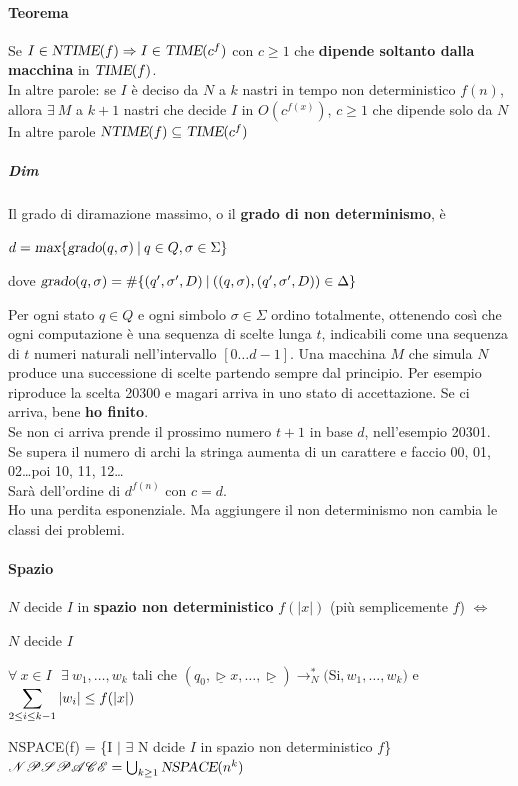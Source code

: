 \documentclass[10pt]{book}
\begin{document}
\paragraph{Teorema} Se $I \in \textsl{NTIME}(f) \Rightarrow I \in \textsl{TIME}(c^f)   $ con $c \geq 1$ che \textbf{dipende soltanto dalla macchina} in $\textsl{TIME}(f)$.\\ In altre parole: se $I$ è deciso da $N$ a $k$ nastri in tempo non deterministico $f(n)$, allora $\exists\:M$ a $k+1$ nastri che decide $I$ in $O(c^{f(x)})$, $c \geq 1$ che dipende solo da $N$\\
In altre parole $\textsl{NTIME}(f) \subseteq \textsl{TIME}(c^f)$
\pagebreak
\subparagraph{Dim} Il grado di diramazione massimo, o il \textbf{grado di non determinismo}, è 
\begin{list}{}{}
	\item $d = \textsl{max}\{\textsl{grado}(q, \sigma)\:|\:q\in Q, \sigma \in \Sigma\}$
	\item dove $\textsl{grado}(q, \sigma) = \#\{(q', \sigma', D)\:|\:((q, \sigma), (q', \sigma', D))\in \Delta \}$
\end{list}
Per ogni stato $q \in Q$ e ogni simbolo $\sigma \in \Sigma$ ordino totalmente, ottenendo così che ogni computazione è una sequenza di scelte lunga $t$, indicabili come una sequenza di $t$ numeri naturali nell'intervallo $[0\ldots d-1]$. Una macchina $M$ che simula $N$ produce una successione di scelte partendo sempre dal principio. Per esempio riproduce la scelta 20300 e magari arriva in uno stato di accettazione. Se ci arriva, bene \textbf{ho finito}.\\
Se non ci arriva prende il prossimo numero $t+1$ in base $d$, nell'esempio 20301.\\
Se supera il numero di archi la stringa aumenta di un carattere e faccio 00, 01, 02\ldots poi 10, 11, 12\ldots\\
Sarà dell'ordine di $d^{f(n)}$ con $c = d$.\\
Ho una perdita esponenziale. Ma aggiungere il non determinismo non cambia le classi dei problemi.
\paragraph{Spazio} $N$ decide $I$ in \textbf{spazio non deterministico} $f(|x|)$ (più semplicemente $f$) $\Leftrightarrow$
\begin{list}{}{}
	\item $N$ decide $I$
	\item $\forall\: x \in I\:\:\:\exists\:w_1,\ldots, w_k$ tali che $(q_0, \underline{\triangleright}x,\ldots,\underline{\triangleright})\rightarrow_N^*($Si$, w_1, \ldots, w_k)$ e $\mathlarger{\sum_{2\leq i \leq k-1}|w_i| \leq f(|x|)}$
\end{list}
NSPACE(f) = \{I $|$ $\exists$ N dcide $I$ in spazio non deterministico $f$\}\\
$\mathscr{NPSPACE} = \bigcup_{k\geq 1}\textsl{NSPACE}(n^k)$
\end{document}
